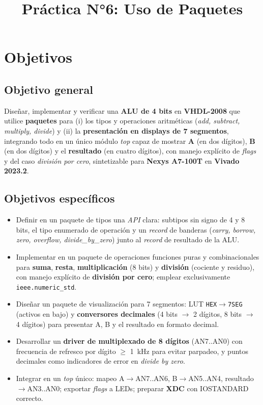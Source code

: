 \documentclass[a4paper,12pt]{article}
\title{Práctica N°6: Uso de Paquetes}
\date{}
\begin{document}
\maketitle
\tableofcontents
\newpage

\section{Objetivos}
\label{sec:objetivos}

\subsection{Objetivo general}
Diseñar, implementar y verificar una \textbf{ALU de 4 bits} en \textbf{VHDL-2008} que utilice \textbf{paquetes} para (i) los tipos y operaciones aritméticas (\textit{add, subtract, multiply, divide}) y (ii) la \textbf{presentación en displays de 7 segmentos}, integrando todo en un único módulo \textit{top} capaz de mostrar \textbf{A} (en dos dígitos), \textbf{B} (en dos dígitos) y el \textbf{resultado} (en cuatro dígitos), con manejo explícito de \textit{flags} y del caso \textit{división por cero}, sintetizable para \textbf{Nexys A7-100T} en \textbf{Vivado 2023.2}.

\subsection{Objetivos específicos}
\begin{itemize}
  \item Definir en un paquete de tipos una \textit{API} clara: subtipos sin signo de 4 y 8 bits, el tipo enumerado de operación y un \textit{record} de banderas (\textit{carry, borrow, zero, overflow, divide\_by\_zero}) junto al \textit{record} de resultado de la ALU.
  \item Implementar en un paquete de operaciones funciones puras y combinacionales para \textbf{suma}, \textbf{resta}, \textbf{multiplicación} (8 bits) y \textbf{división} (cociente y residuo), con manejo explícito de \textbf{división por cero}; emplear exclusivamente \texttt{ieee.numeric\_std}.
  \item Diseñar un paquete de visualización para 7 segmentos: LUT \texttt{HEX$\rightarrow$7SEG} (activos en bajo) y \textbf{conversores decimales} (4 bits $\rightarrow$ 2 dígitos, 8 bits $\rightarrow$ 4 dígitos) para presentar A, B y el resultado en formato decimal.
  \item Desarrollar un \textbf{driver de multiplexado de 8 dígitos} (AN7..AN0) con frecuencia de refresco por dígito $\geq$ 1~kHz para evitar parpadeo, y puntos decimales como indicadores de error en \textit{divide by zero}.
  \item Integrar en un \textit{top} único: mapeo A$\rightarrow$AN7..AN6, B$\rightarrow$AN5..AN4, resultado
  $\rightarrow$AN3..AN0; exportar \textit{flags} a LEDs; preparar \textbf{XDC} con IOSTANDARD correcto.
  
\end{itemize}
\end{document}
